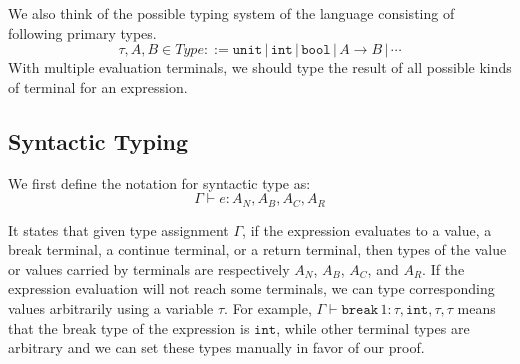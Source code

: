 \documentclass{article}
\numberwithin{algorithm}{section}
\newcommand{\cmdbreak}{\texttt{break}\,}
\newcommand{\tunit}{\texttt{unit}}
\newcommand{\tint}{\texttt{int}}
\newcommand{\tbool}{\texttt{bool}}
\newcommand{\sep}{\,|\,}
\begin{document}
We also think of the possible typing system of the language consisting of following primary types.
$$
\tau, A, B \in \textit{Type} ::= \tunit \sep \tint \sep \tbool \sep A \rightarrow B \sep \cdots
$$
With multiple evaluation terminals, we should type the result of all possible kinds of terminal for an expression.

\subsection{Syntactic Typing}

We first define the notation for syntactic type as:
$$
    \Gamma \vdash e: A_N, A_B, A_C, A_R
$$

It states that given type assignment $\Gamma$, if the expression evaluates to a value, a break terminal, a continue terminal, or a return terminal, then types of the value or values carried by terminals are respectively $A_N$, $A_B$, $A_C$, and $A_R$.
If the expression evaluation will not reach some terminals, we can type corresponding values arbitrarily using a variable $\tau$.
For example, $\Gamma \vdash \cmdbreak 1: \tau, \tint, \tau, \tau$ means that the break type of the expression is $\tint$, while other terminal types are arbitrary and we can set these types manually in favor of our proof.


\end{document}
